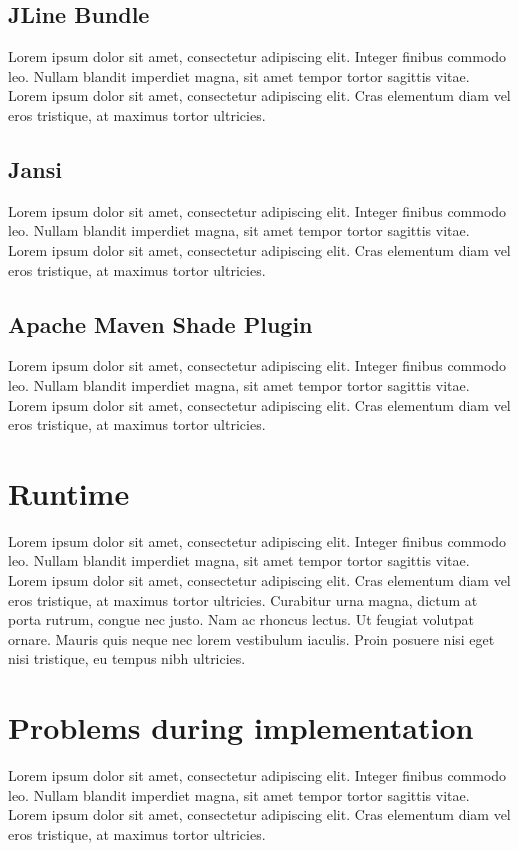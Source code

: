 \documentclass[
  digital,     %
  oneside,     %
  nosansbold,  %
  nocolorbold, %
  lof,         %
  lot,         %
]{fithesis4}
\begin{document}
\subsection{JLine Bundle}
Lorem ipsum dolor sit amet, consectetur adipiscing elit. Integer finibus commodo leo. Nullam blandit imperdiet magna, sit amet tempor tortor sagittis vitae. Lorem ipsum dolor sit amet, consectetur adipiscing elit. Cras elementum diam vel eros tristique, at maximus tortor ultricies.

\subsection{Jansi}
Lorem ipsum dolor sit amet, consectetur adipiscing elit. Integer finibus commodo leo. Nullam blandit imperdiet magna, sit amet tempor tortor sagittis vitae. Lorem ipsum dolor sit amet, consectetur adipiscing elit. Cras elementum diam vel eros tristique, at maximus tortor ultricies.

\subsection{Apache Maven Shade Plugin}
Lorem ipsum dolor sit amet, consectetur adipiscing elit. Integer finibus commodo leo. Nullam blandit imperdiet magna, sit amet tempor tortor sagittis vitae. Lorem ipsum dolor sit amet, consectetur adipiscing elit. Cras elementum diam vel eros tristique, at maximus tortor ultricies.
\shorthandon{-}

\section{Runtime}
Lorem ipsum dolor sit amet, consectetur adipiscing elit. Integer finibus commodo leo. Nullam blandit imperdiet magna, sit amet tempor tortor sagittis vitae. Lorem ipsum dolor sit amet, consectetur adipiscing elit. Cras elementum diam vel eros tristique, at maximus tortor ultricies. Curabitur urna magna, dictum at porta rutrum, congue nec justo. Nam ac rhoncus lectus. Ut feugiat volutpat ornare. Mauris quis neque nec lorem vestibulum iaculis. Proin posuere nisi eget nisi tristique, eu tempus nibh ultricies.

\section{Problems during implementation}
Lorem ipsum dolor sit amet, consectetur adipiscing elit. Integer finibus commodo leo. Nullam blandit imperdiet magna, sit amet tempor tortor sagittis vitae. Lorem ipsum dolor sit amet, consectetur adipiscing elit. Cras elementum diam vel eros tristique, at maximus tortor ultricies.
\end{document}

